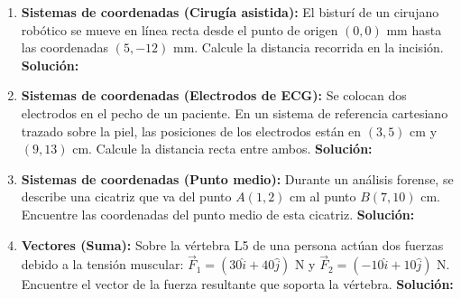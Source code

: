 \documentclass[12pt,letterpaper]{article}
\begin{document}
\begin{enumerate}
    \item \textbf{Sistemas de coordenadas (Cirugía asistida):} El bisturí de un cirujano robótico se mueve en línea recta desde el punto de origen $(0,0)$ mm hasta las coordenadas $(5, -12)$ mm. Calcule la distancia recorrida en la incisión.
    \textbf{Solución:} \\

    
    \item \textbf{Sistemas de coordenadas (Electrodos de ECG):} Se colocan dos electrodos en el pecho de un paciente. En un sistema de referencia cartesiano trazado sobre la piel, las posiciones de los electrodos están en $(3, 5)$ cm y $(9, 13)$ cm. Calcule la distancia recta entre ambos.
    \textbf{Solución:} \\

    
    \item \textbf{Sistemas de coordenadas (Punto medio):} Durante un análisis forense, se describe una cicatriz que va del punto $A(1, 2)$ cm al punto $B(7, 10)$ cm. Encuentre las coordenadas del punto medio de esta cicatriz.
    \textbf{Solución:} \\

    \item \textbf{Vectores (Suma):} Sobre la vértebra L5 de una persona actúan dos fuerzas debido a la tensión muscular: $\vec{F}_1 = (30\hat{i} + 40\hat{j})$ N y $\vec{F}_2 = (-10\hat{i} + 10\hat{j})$ N. Encuentre el vector de la fuerza resultante que soporta la vértebra.
    \textbf{Solución:} \\

    

\end{enumerate}
\end{document}
